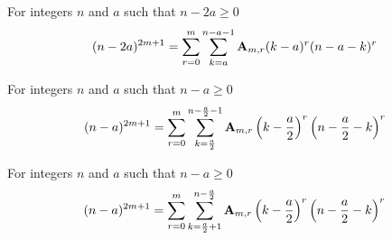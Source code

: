 \begin{corollary}
    \label{prop:shifted-negated-binomial-form}
    For integers $n$ and $a$ such that $n-2a \geq 0$
    \begin{align*}
    (n-2a)^{2m+1} = \sum_{r=0}^{m} \sum_{k=a}^{n-a-1} {\mathbf{A}} \sb{m,r} (k-a)^r (n-a-k)^r
    \end{align*}
\end{corollary}

\begin{corollary}
    \label{cor:centered-negated-binomial-form}
    For integers $n$ and $a$ such that $n-a \geq 0$
    \begin{align*}
    (n-a)^{2m+1} = \sum_{r=0}^{m} \sum_{k=\frac{a}{2}}^{n-\frac{a}{2}-1} {\mathbf{A}} \sb{m,r} \left( k-\frac{a}{2} \right)^r \left(n-\frac{a}{2}-k \right)^r
    \end{align*}
\end{corollary}

\begin{corollary}
    \label{cor:shifted-centered-negated-binomial-form}
    For integers $n$ and $a$ such that $n-a \geq 0$
    \begin{align*}
    (n-a)^{2m+1} = \sum_{r=0}^{m} \sum_{k=\frac{a}{2}+1}^{n-\frac{a}{2}} {\mathbf{A}} \sb{m,r} \left( k-\frac{a}{2} \right)^r \left(n-\frac{a}{2}-k \right)^r
    \end{align*}
\end{corollary}
